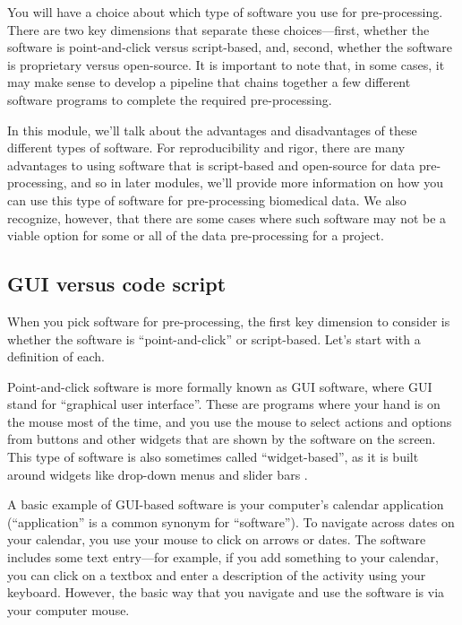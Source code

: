\documentclass[]{tufte-book}
\begin{document}
You will have a choice about which type of software you use for pre-processing.
There are two key dimensions that separate these choices---first, whether the
software is point-and-click versus script-based, and, second, whether the
software is proprietary versus open-source. It is important to note
that, in some cases, it may make sense to develop a pipeline that chains
together a few different software programs to complete the required
pre-processing.

In this module, we'll talk about the advantages and disadvantages of these
different types of software. For reproducibility and rigor, there are many
advantages to using software that is script-based and open-source for data
pre-processing, and so in later modules, we'll provide more information on how
you can use this type of software for pre-processing biomedical data. We also
recognize, however, that there are some cases where such software may not be a
viable option for some or all of the data pre-processing for a project.

\subsection{GUI versus code script}\label{gui-versus-code-script}

When you pick software for pre-processing, the first key dimension to consider
is whether the software is ``point-and-click'' or script-based.
Let's start with a definition of each.

Point-and-click software is more formally known as GUI software, where GUI stand
for ``graphical user interface''. These are programs where your hand is on the
mouse most of the time, and you use the mouse to select actions and options from
buttons and other widgets that are shown by the software on the screen. This
type of software is also sometimes called ``widget-based'', as it is built around
widgets like drop-down menus and slider bars \citep{perkel2018future}.

A basic example of GUI-based software is your computer's calendar application
(``application'' is a common synonym for ``software''). To navigate across dates on
your calendar, you use your mouse to click on arrows or dates.
The software includes some text entry---for example, if you add something to
your calendar, you can click on a textbox and enter a description of the
activity using your keyboard. However, the basic way that you navigate and use
the software is via your computer mouse.
\end{document}
